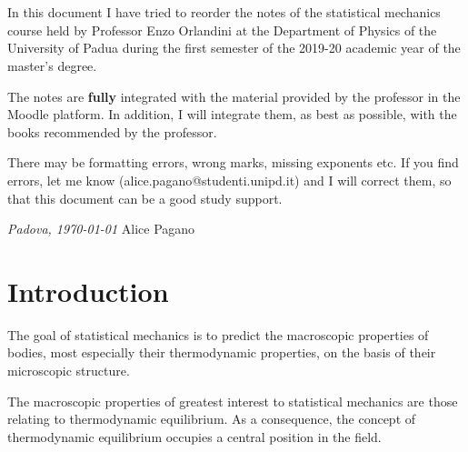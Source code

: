 \documentclass[11pt, a4paper, twoside, openright]{book}
\begin{document}

\frontmatter




\chapter*{}
\noindent In this document I have tried to reorder the notes of the statistical mechanics course held by Professor Enzo Orlandini at the Department
of Physics of the University of Padua during the first semester of the 2019-20 academic year of the master's degree.

The notes are \textbf{fully} integrated with the material provided by the professor in the Moodle platform. 
In addition, I will integrate them, as best as possible, with the books recommended by the professor.

There may be formatting errors, wrong marks, missing exponents etc. If you find errors, let me know (alice.pagano@studenti.unipd.it) and I will correct them, so that this document can be a good study support.

\vspace{1cm}
\noindent \textit{Padova, \today}  \hspace{4cm} Alice Pagano

\tableofcontents


\pagestyle{plain}

\chapter{Introduction}

The goal of statistical mechanics \cite{introduction} is to predict the macroscopic properties of bodies, most especially their thermodynamic properties, on the basis of their microscopic structure.

The macroscopic properties of greatest interest to statistical mechanics are those relating to thermodynamic equilibrium. As a consequence, the concept of thermodynamic equilibrium occupies a central position in the field. 
\end{document}
